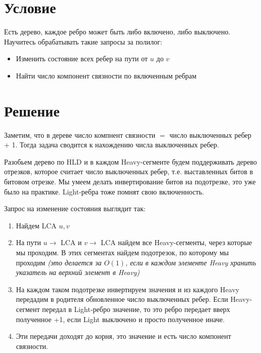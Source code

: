 \documentclass[12pt, a4paper]{article}
\begin{document}
    
\section*{Условие}

Есть дерево, каждое ребро может быть либо включено, либо выключено. Научитесь обрабатывать такие запросы за полилог:
\begin{itemize}
    \item Изменить состояние всех ребер на пути от $u$ до $v$
    \item Найти число компонент связности по включенным ребрам
\end{itemize}

\section*{Решение}

Заметим, что в дереве число компнент связности $=$ число выключенных ребер + 1. Тогда задача сводится к нахождению числа выключенных ребер.

Разобьем дерево по HLD и в каждом Heavy-сегменте будем поддерживать дерево отрезков, которое считает число выключенных ребер, т.е. выставленных битов в битовом отрезке. Мы умеем делать инвертирование битов на подотрезке, это уже было на практике. Light-ребра тоже помнят свою включенность.

Запрос на изменение состояния выглядит так:
\begin{enumerate}
    \item Найдем LCA $u, v$
    \item На пути $u\to$ LCA и $v\to$ LCA найдем все Heavy-сегменты, через которые мы проходим. В этих сегментах найдем подотрезок, по которому мы проходим \textit{(это делается за $O(1)$, если в каждом элементе Heavy хранить указатель на верхний элемент в Heavy)}
    \item На каждом таком подотрезке инвертируем значения и из каждого Heavy передадим в родителя обновленное число выключенных ребер. Если Heavy-сегмент передал в Light-ребро значение, то это ребро передает вверх полученное +1, если Light выключено и просто полученное иначе.
    \item Эти передачи доходят до корня, это значение и есть число компонент связности.
\end{enumerate}
\end{document}
